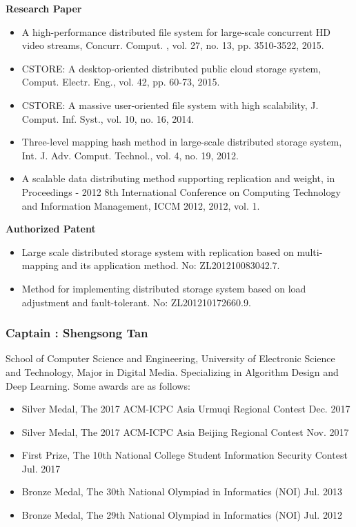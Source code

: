\documentclass{mcmthesis}
\begin{document}
\textbf{Research Paper}

\begin{itemize}
	\item A high-performance distributed file system for large-scale concurrent HD video streams, Concurr. Comput. , vol. 27, no. 13, pp. 3510-3522, 2015.
	\item CSTORE: A desktop-oriented distributed public cloud storage system, Comput. Electr. Eng., vol. 42, pp. 60-73, 2015.
	\item CSTORE: A massive user-oriented file system with high scalability, J. Comput. Inf. Syst., vol. 10, no. 16, 2014.
	\item Three-level mapping hash method in large-scale distributed storage system, Int. J. Adv. Comput. Technol., vol. 4, no. 19, 2012.
	\item A scalable data distributing method supporting replication and weight, in Proceedings - 2012 8th International Conference on Computing Technology and Information Management, ICCM 2012, 2012, vol. 1.
\end{itemize}


\textbf{Authorized Patent}

\begin{itemize}
	\item Large scale distributed storage system with replication based on multi-mapping and its application method. No: ZL201210083042.7.
	\item Method for implementing distributed storage system based on load adjustment and fault-tolerant. No: ZL201210172660.9. 
\end{itemize}


\subsubsection*{\textbf{Captain} : Shengsong Tan}

\par School of Computer Science and Engineering, University of Electronic Science and Technology, Major in Digital Media. Specializing in Algorithm Design and Deep Learning. Some awards are as follows:

\begin{itemize}
	\item Silver Medal, The 2017 ACM-ICPC Asia Urmuqi Regional Contest Dec. 2017
	\item Silver Medal, The 2017 ACM-ICPC Asia Beijing Regional Contest Nov. 2017
	\item First Prize, The 10th National College Student Information Security Contest Jul. 2017
	\item Bronze Medal, The 30th National Olympiad in Informatics (NOI) Jul. 2013
	\item Bronze Medal, The 29th National Olympiad in Informatics (NOI) Jul. 2012
\end{itemize}
\end{document}
